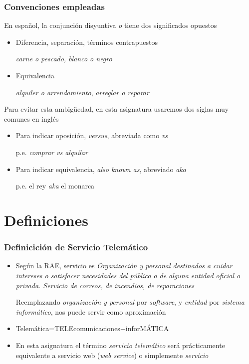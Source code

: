\documentclass[ucs]{beamer}
\begin{document}
\begin{frame}[fragile]
\frametitle{Convenciones empleadas}
En español, la conjunción disyuntiva \emph{o} tiene dos significados opuestos
\begin{itemize}
\item
Diferencia, separación, términos contrapuestos

\emph{carne o pescado, blanco o negro}
\item
Equivalencia

\emph{alquiler o arrendamiento},
\emph{arreglar o reparar}
\end{itemize}
Para evitar esta ambigüedad, en esta asignatura usaremos dos siglas muy
comunes en inglés

\begin{itemize}
\item
Para indicar oposición, 
\emph{versus},  
abreviada como
\emph{vs}  


p.e. \emph{comprar vs alquilar}
\item
Para indicar equivalencia, \emph{also known as}, abreviado \emph{aka}

p.e.
el rey 
 \emph{aka}
el monarca

\end{itemize}

\end{frame}



\section{Definiciones}
\begin{frame}[fragile]
\frametitle{Definicición de Servicio Telemático}
\begin{itemize}
\item
Según la RAE, servicio es \emph{Organización y personal destinados a cuidar intereses o satisfacer necesidades del público o de alguna entidad oficial o privada. Servicio de correos, de incendios, de reparaciones}

Reemplazando \emph{organización y personal} por \emph{software}, y \emph{entidad} por \emph{sistema informático},
nos puede servir como aproximación

\item
Telemática=TELEcomunicaciones+inforMÁTICA

\item
En esta asignatura el término \emph{servicio telemático} será prácticamente equivalente a 
servicio web (\emph{web service}) o simplemente \emph{servicio}

\end{itemize}

\end{frame}
\end{document}
